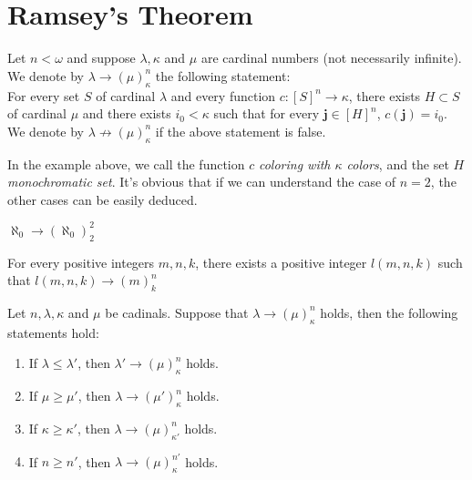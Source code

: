 \newpage
\section{Ramsey's Theorem}

\begin{notation}
    Let $n<\omega$ and suppose $\lambda, \kappa$ and $\mu$ are cardinal numbers (not necessarily infinite). We denote by $\lambda\to(\mu)_\kappa^n$ the following statement: \\
    For every set $S$ of cardinal $\lambda$ and every function $c:[S]^n\to\kappa$, there exists $H\subset S$ of cardinal $\mu$ and there exists $i_0<\kappa$ such that for every $\boldsymbol j\in[H]^n$, $c(\boldsymbol j)=i_0$. \\
    We denote by $\lambda\not\to(\mu)_\kappa^n$ if the above statement is false.
\end{notation}

In the example above, we call the function $c$ \emph{coloring with $\kappa$ colors}, and the set $H$ \emph{monochromatic set}. It's obvious that if we can understand the case of $n=2$, the other cases can be easily deduced.


\begin{theorem}
    $\aleph_0\to(\aleph_0)_2^2$
\end{theorem}

\begin{theorem}
    For every positive integers $m, n, k$, there exists a positive integer $l(m,n,k)$ such that $l(m,n,k)\to (m)_k^n$
\end{theorem}

\begin{lemma}
    Let $n,\lambda,\kappa$ and $\mu$ be cadinals. Suppose that $\lambda\to(\mu)_\kappa^n$ holds, then the following statements hold:
    \begin{enumerate}
        \item\label{lemma:lambda} If $\lambda\leq\lambda'$, then $\lambda'\to(\mu)_\kappa^n$ holds.
        \item If $\mu\geq\mu'$, then $\lambda\to(\mu')_\kappa^n$ holds.
        \item If $\kappa\geq\kappa'$, then $\lambda\to(\mu)_{\kappa'}^n$ holds.
        \item If $n\geq n'$, then $\lambda\to(\mu)_\kappa^{n'}$ holds.
    \end{enumerate}
\end{lemma}

